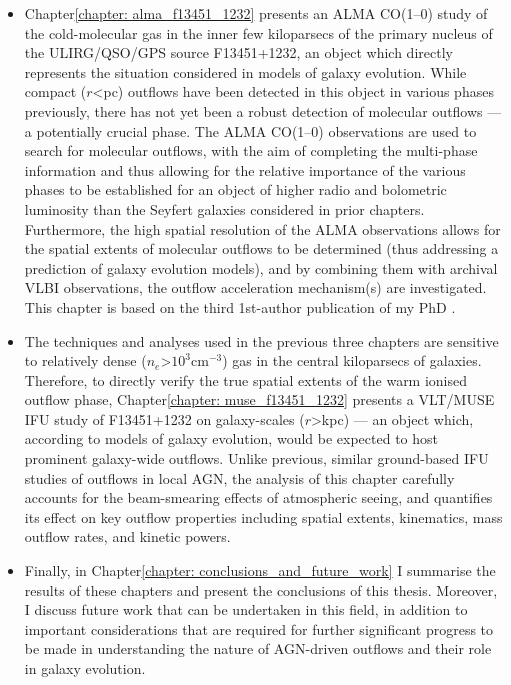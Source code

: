 \begin{itemize}
    \item Chapter\;\ref{chapter: alma_f13451_1232} presents an ALMA CO(1--0) study of the cold-molecular gas in the inner few kiloparsecs of the primary nucleus of the ULIRG/QSO/GPS source F13451+1232, an object which directly represents the situation considered in models of galaxy evolution. While compact ($r$\;\textless{}\;pc) outflows have been detected in this object in various phases previously, there has not yet been a robust detection of molecular outflows --- a potentially crucial phase. The ALMA CO(1--0) observations are used to search for molecular outflows, with the aim of completing the multi-phase information and thus allowing for the relative importance of the various phases to be established for an object of higher radio and bolometric luminosity than the Seyfert galaxies considered in prior chapters. Furthermore, the high spatial resolution of the ALMA observations allows for the spatial extents of molecular outflows to be determined (thus addressing a prediction of galaxy evolution models), and by combining them with archival VLBI observations, the outflow acceleration mechanism(s) are investigated. This chapter is based on the third 1st-author publication of my PhD \citep{Holden2024}.
    \item The techniques and analyses used in the previous three chapters are sensitive to relatively dense ($n_e$\;\textgreater\;$10^{3}$\;cm$^{-3}$) gas in the central kiloparsecs of galaxies. Therefore, to directly verify the true spatial extents of the warm ionised outflow phase, Chapter\;\ref{chapter: muse_f13451_1232} presents a VLT/MUSE IFU study of F13451+1232 on galaxy-scales ($r$\;\textgreater{}\;kpc) --- an object which, according to models of galaxy evolution, would be expected to host prominent galaxy-wide outflows. Unlike previous, similar ground-based IFU studies of outflows in local AGN, the analysis of this chapter carefully accounts for the beam-smearing effects of atmospheric seeing, and quantifies its effect on key outflow properties including spatial extents, kinematics, mass outflow rates, and kinetic powers.
    \item Finally, in Chapter\;\ref{chapter: conclusions_and_future_work} I summarise the results of these chapters and present the conclusions of this thesis. Moreover, I discuss future work that can be undertaken in this field, in addition to important considerations that are required for further significant progress to be made in understanding the nature of AGN-driven outflows and their role in galaxy evolution.
\end{itemize}

